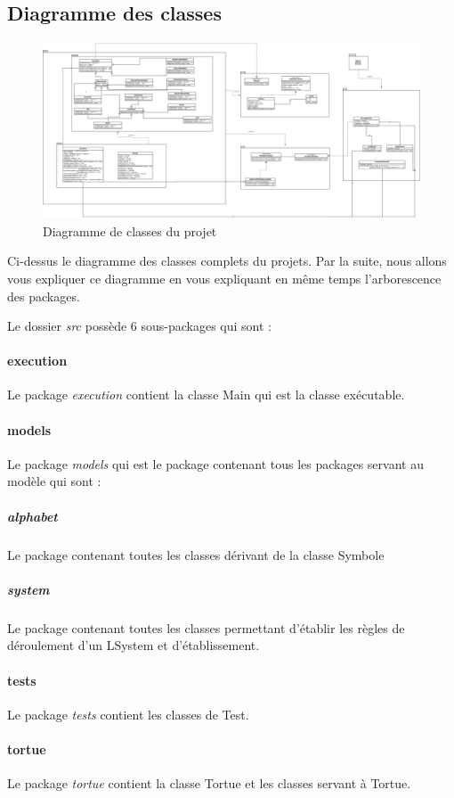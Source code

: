 \documentclass[12pt]{article}
\begin{document}
\subsection{Diagramme des classes}
\begin{figure}[h]
	\center
	\includegraphics[width=1\textwidth]{./images/DiagrammeLSystem.png}
	\caption{Diagramme de classes du projet\label{fig:figure2}}
\end{figure}

Ci-dessus le diagramme des classes complets du projets. Par la suite, nous allons vous expliquer ce diagramme en vous expliquant en même temps l'arborescence des packages.

Le dossier \textit{src} possède 6 sous-packages qui sont :
\paragraph{execution}
Le package \textit{execution} contient la classe Main qui est la classe exécutable.
\paragraph{models} 
Le package \textit{models} qui est le package contenant tous les packages servant au modèle qui sont :
\subparagraph{alphabet}
Le package contenant toutes les classes dérivant de la classe Symbole
\subparagraph{system}
Le package contenant toutes les classes permettant d'établir les règles de déroulement d'un LSystem et d'établissement.
\paragraph{tests}
Le package \textit{tests} contient les classes de Test.
\paragraph{tortue}
Le package \textit{tortue} contient la classe Tortue et les classes servant à Tortue.
\end{document}
